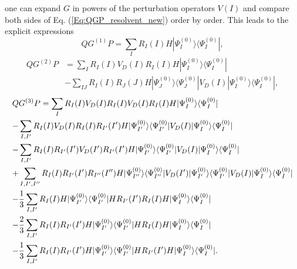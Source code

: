 one can expand $G$ in powers of the perturbation operators $V(I)$ and compare both sides of Eq. (\ref{Eq:QGP_resolvent_new}) order by order. This leads to the explicit expressions
	\begin{equation}
	\label{Eq:QG1P_resolvent_new}
	Q{G^{(1)}}P = \sum\limits_I {{R_I}} (I)H|\Psi _I^{(0)}\rangle \langle \Psi _I^{(0)}|,
	\end{equation}
	\begin{equation}
	\begin{aligned}
	Q{G^{(2)}}P &= \sum\limits_I {{R_I}} (I){V_D}(I){R_I}(I)H|\Psi _I^{(0)}\rangle \langle \Psi _I^{(0)}| \\
	&- \sum\limits_{IJ} {{R_I}} (I){R_J}(J)H|\Psi _J^{(0)}\rangle \langle \Psi _J^{(0)}|{V_D}(I)|\Psi _I^{(0)}\rangle \langle \Psi _I^{(0)}|,
	\end{aligned}
	\end{equation}
	\begin{equation}\begin{gathered}
  Q{G^{(3)}}P = \sum\limits_I {{R_I}} (I){V_D}(I){R_I}(I){V_D}(I){R_I}(I)H|\Psi _I^{(0)}\rangle \langle \Psi _I^{(0)}| \hfill \\
   - \sum\limits_{I,I'} {{R_I}} (I){V_D}(I){R_I}(I){R_{I'}}(I')H|\Psi _{I'}^{(0)}\rangle \langle \Psi _{I'}^{(0)}|{V_D}(I)|\Psi _I^{(0)}\rangle \langle \Psi _I^{(0)}| \hfill \\
   - \sum\limits_{I,I'} {{R_I}} (I){R_{I'}}(I'){V_D}(I'){R_{I'}}(I')H|\Psi _{I'}^{(0)}\rangle \langle \Psi _{I'}^{(0)}|{V_D}(I)|\Psi _I^{(0)}\rangle \langle \Psi _I^{(0)}| \hfill \\
   + \sum\limits_{I,I',I''} {{R_I}} (I){R_{I'}}(I'){R_{I''}}(I'')H|\Psi _{I''}^{(0)}\rangle \langle \Psi _{I''}^{(0)}|{V_D}(I')|\Psi _{I'}^{(0)}\rangle \langle \Psi _{I'}^{(0)}|{V_D}(I)|\Psi _I^{(0)}\rangle \langle \Psi _I^{(0)}| \hfill \\
   - \frac{1}{3}\sum\limits_{I,I'} {{R_I}} (I)H|\Psi _{I'}^{(0)}\rangle \langle \Psi _{I'}^{(0)}|H{R_{I'}}(I'){R_I}(I)H|\Psi _I^{(0)}\rangle \langle \Psi _I^{(0)}| \hfill \\
   - \frac{2}{3}\sum\limits_{I,I'} {{R_I}} (I){R_{I'}}(I')H|\Psi _{I'}^{(0)}\rangle \langle \Psi _{I'}^{(0)}|H{R_I}(I)H|\Psi _I^{(0)}\rangle \langle \Psi _I^{(0)}| \hfill \\
   - \frac{1}{3}\sum\limits_{I,I'} {{R_I}} (I){R_{I'}}(I')H|\Psi _{I'}^{(0)}\rangle \langle \Psi _{I'}^{(0)}|H{R_{I'}}(I')H|\Psi _I^{(0)}\rangle \langle \Psi _I^{(0)}|. \hfill \\ 
\end{gathered} \end{equation}

